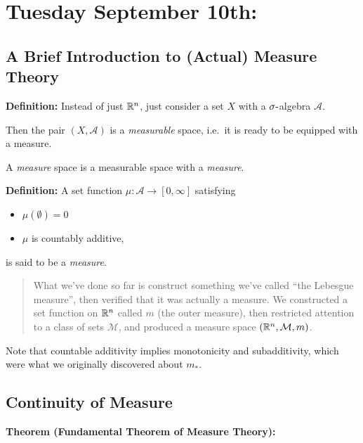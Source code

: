 \hypertarget{tuesday-september-10th}{%
\section{Tuesday September 10th:}\label{tuesday-september-10th}}

\hypertarget{a-brief-introduction-to-actual-measure-theory}{%
\subsection{A Brief Introduction to (Actual) Measure
Theory}\label{a-brief-introduction-to-actual-measure-theory}}

\textbf{Definition:} Instead of just \({\mathbb{R}}^n\), just consider a set
\(X\) with a \(\sigma{\hbox{-}}\)algebra \(\mathcal A\).

Then the pair \((X, \mathcal A)\) is a \emph{measurable} space, i.e.~it
is ready to be equipped with a measure.

A \emph{measure} space is a measurable space with a \emph{measure}.

\textbf{Definition:} A set function \(\mu: \mathcal A \to [0, \infty]\)
satisfying

\begin{itemize}
\tightlist
\item
  \(\mu(\emptyset) = 0\)
\item
  \(\mu\) is countably additive,
\end{itemize}

is said to be a \emph{measure}.

\begin{quote}
What we've done so far is construct something we've called ``the
Lebesgue measure'', then verified that it was actually a measure. We
constructed a set function on \({\mathbb{R}}^n\) called \(m\) (the outer
measure), then restricted attention to a class of sets \(\mathcal M\),
and produced a measure space \(({\mathbb{R}}^n, \mathcal M, m)\).
\end{quote}

Note that countable additivity implies monotonicity and subadditivity,
which were what we originally discovered about \(m_*\).

\hypertarget{continuity-of-measure}{%
\subsection{Continuity of Measure}\label{continuity-of-measure}}

\textbf{Theorem (Fundamental Theorem of Measure Theory):}

